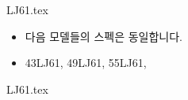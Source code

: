 \documentclass{beamer}
\begin{document}
{LJ61.tex}		%


\begin{frame}[t]{}
\tableofcontents
\huge
\begin{itemize}
\large \item 다음 모델들의 스펙은 동일합니다.
\huge \item 43LJ61, 49LJ61, 55LJ61, 
\end{itemize}
\end{frame}

{LJ61.tex}			%
\end{document}

